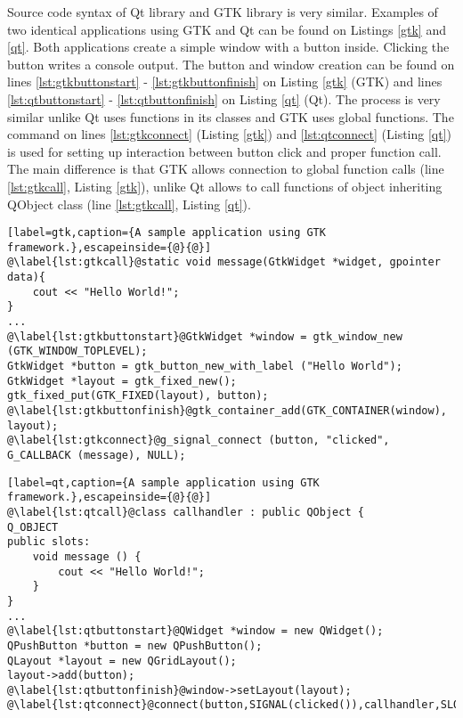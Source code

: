Source code syntax of Qt library and GTK library is very similar. Examples of two identical applications using GTK and Qt can be found on Listings \ref{gtk} and \ref{qt}. Both applications create a simple window with a button inside. Clicking the button writes a console output. The button and window creation can be found on lines \ref{lst:gtkbuttonstart} - \ref{lst:gtkbuttonfinish} on Listing \ref{gtk} (GTK) and lines \ref{lst:qtbuttonstart} - \ref{lst:qtbuttonfinish} on Listing \ref{qt} (Qt). The process is very similar unlike Qt uses functions in its classes and GTK uses global functions. The command on lines \ref{lst:gtkconnect} (Listing \ref{gtk}) and \ref{lst:qtconnect} (Listing \ref{qt}) is used for setting up interaction between button click and proper function call. The main difference is that GTK allows connection to global function calls (line \ref{lst:gtkcall}, Listing \ref{gtk}), unlike Qt allows to call functions of object inheriting QObject class (line \ref{lst:gtkcall}, Listing \ref{qt}).

\begin{lstlisting}[label=gtk,caption={A sample application using GTK framework.},escapeinside={@}{@}]
@\label{lst:gtkcall}@static void message(GtkWidget *widget, gpointer data){
    cout << "Hello World!";
}
...
@\label{lst:gtkbuttonstart}@GtkWidget *window = gtk_window_new (GTK_WINDOW_TOPLEVEL);
GtkWidget *button = gtk_button_new_with_label ("Hello World");
GtkWidget *layout = gtk_fixed_new();
gtk_fixed_put(GTK_FIXED(layout), button);
@\label{lst:gtkbuttonfinish}@gtk_container_add(GTK_CONTAINER(window), layout);
@\label{lst:gtkconnect}@g_signal_connect (button, "clicked", G_CALLBACK (message), NULL);
\end{lstlisting}

\begin{lstlisting}[label=qt,caption={A sample application using GTK framework.},escapeinside={@}{@}]
@\label{lst:qtcall}@class callhandler : public QObject {
Q_OBJECT
public slots:
	void message () {
		cout << "Hello World!";
	}
}
...
@\label{lst:qtbuttonstart}@QWidget *window = new QWidget();
QPushButton *button = new QPushButton();
QLayout *layout = new QGridLayout();
layout->add(button);
@\label{lst:qtbuttonfinish}@window->setLayout(layout);
@\label{lst:qtconnect}@connect(button,SIGNAL(clicked()),callhandler,SLOT(message()));
\end{lstlisting}